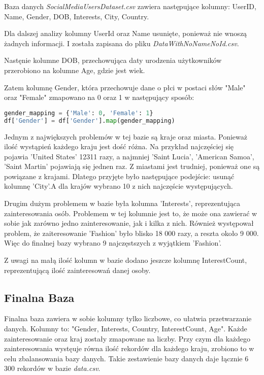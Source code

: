 \documentclass[12pt,a4paper]{article}
\begin{document}
Baza danych \textit{SocialMediaUsersDataset.csv} zawiera następujące kolumny: UserID, Name, Gender, DOB, Interests, City, Country. 

Dla dalszej analizy kolumny UserId oraz Name usunięte, ponieważ nie wnoszą żadnych informacji. I została zapisana do pliku \textit{DataWithNoNameNoId.csv}.

Nastęnie kolumne DOB, przechowująca daty urodzenia użytkowników przerobiono na kolumne Age, gdzie jest wiek. 

Zatem kolumnę Gender, która przechowuje dane o płci w postaci słów "Male" oraz "Female" zmapowano na 0 oraz 1 w następujący sposób:

\begin{lstlisting}[language=Python]
gender_mapping = {'Male': 0, 'Female': 1}
df['Gender'] = df['Gender'].map(gender_mapping)
\end{lstlisting}

Jednym z największych problemów w tej bazie są kraje oraz miasta. Ponieważ ilość wystąpień każdego kraju jest dość różna. Na przykład najczęściej się pojawia 'United States' 12311 razy, a najmniej 'Saint Lucia', 'American Samoa', 'Saint Martin' pojawiają się jednen raz. Z miastami jest trudniej, ponieważ one są powiązane z krajami. Dlatego przyjęte było następujące podejście: usunąć kolumnę 'City'.A dla krajów wybrano 10 z nich najczęście występujących.

Drugim dużym problemem w bazie była kolumna 'Interests', reprezentująca zainteresowania osób. Problemem w tej kolumnie jest to, że może ona zawierać w sobie jak zarówno jedno zainteresowanie, jak i kilka z nich. Również występował problem, że zaiteresowanie 'Fashion' było blisko 18 000 razy, a reszta około 9 000. Więc do finalnej bazy wybrano 9 najczęstszych z wyjątkiem 'Fashion'.

Z uwagi na małą ilość kolumn w bazie dodano jeszcze kolumnę InterestCount, reprezentującą ilość zainteresowań danej osoby.

\newpage

\subsection{Finalna Baza}
Finalna baza zawiera w sobie kolumny tylko liczbowe, co ułatwia przetwarzanie danych. Kolumny to: "Gender, Interests, Country, InterestCount, Age". Każde zainteresowanie oraz kraj zostały zmapowane na liczby. Przy czym dla każdego zainteresowania wystęuje równa ilość rekordów dla każdego kraju, zrobiono to w celu zbalansowania bazy danych. Takie zestawienie bazy danych daje łącznie 6 300 rekordów w bazie \textit{data.csv}.
\end{document}
